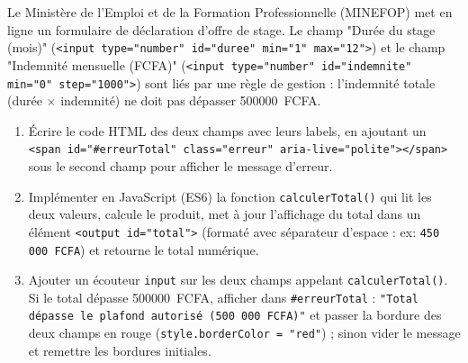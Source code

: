 \documentclass[11pt]{article}
\begin{document}
\begin{exercice}
Le Ministère de l'Emploi et de la Formation Professionnelle (MINEFOP) met en ligne un formulaire de déclaration d'offre de stage. Le champ "Durée du stage (mois)" (\texttt{<input type="number" id="duree" min="1" max="12">}) et le champ "Indemnité mensuelle (FCFA)" (\texttt{<input type="number" id="indemnite" min="0" step="1000">}) sont liés par une règle de gestion : l'indemnité totale (durée $\times$ indemnité) ne doit pas dépasser \SI{500000}{FCFA}.
\begin{enumerate}
    \item Écrire le code HTML des deux champs avec leurs labels, en ajoutant un \texttt{<span id="\#erreurTotal" class="erreur" aria-live="polite"></span>} sous le second champ pour afficher le message d'erreur.
    \item Implémenter en JavaScript (ES6) la fonction \texttt{calculerTotal()} qui lit les deux valeurs, calcule le produit, met à jour l'affichage du total dans un élément \texttt{<output id="total">} (formaté avec séparateur d'espace : ex: \texttt{450 000 FCFA}) et retourne le total numérique.
    \item Ajouter un écouteur \texttt{input} sur les deux champs appelant \texttt{calculerTotal()}. Si le total dépasse \SI{500000}{FCFA}, afficher dans \texttt{\#erreurTotal} : \texttt{"Total dépasse le plafond autorisé (500 000 FCFA)"} et passer la bordure des deux champs en rouge (\texttt{style.borderColor = "red"}) ; sinon vider le message et remettre les bordures initiales.
\end{enumerate}
\end{exercice}
\end{document}
